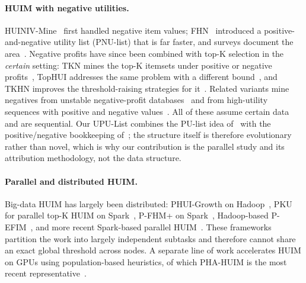 \documentclass[pdflatex,sn-vancouver-num]{sn-jnl}
\theoremstyle{thmstyleone}%
\theoremstyle{thmstyletwo}%
\theoremstyle{thmstylethree}%
\newcommand{\Kk}{\mathrm{K}}
\begin{document}
\paragraph{HUIM with negative utilities.}
HUINIV-Mine~\cite{chu2009huiniv} first handled negative item values;
FHN~\cite{lin2016fhn} introduced a positive-and-negative utility list
(PNU-list) that is far faster, and surveys document the
area~\cite{singh2018negsurvey}. Negative profits have since been
combined with top-$\Kk$ selection in the \emph{certain} setting: TKN
mines the top-$\Kk$ itemsets under positive or negative
profits~\cite{krishnamoorthy2022tkn}, TopHUI addresses the same problem
with a different bound~\cite{gan2020tophui}, and TKHN improves the
threshold-raising strategies for it~\cite{singh2026tkhn}. Related
variants mine negatives from unstable negative-profit
databases~\cite{tung2024unstable} and from high-utility sequences with
positive and negative values~\cite{zhang2023posneg}. All of these assume
certain data and are sequential. Our UPU-List combines the PU-list idea
of~\cite{lin2016phuim} with the positive/negative bookkeeping
of~\cite{lin2016fhn}; the structure itself is therefore evolutionary
rather than novel, which is why our contribution is the parallel study
and its attribution methodology, not the data structure.

\paragraph{Parallel and distributed HUIM.}
Big-data HUIM has largely been distributed: PHUI-Growth on
Hadoop~\cite{lin2015bigdata}, PKU for parallel top-$\Kk$ HUIM on
Spark~\cite{lin2019pku}, P-FHM+ on Spark~\cite{sethi2018pfhm},
Hadoop-based P-EFIM~\cite{cheng2023hadoop}, and more recent Spark-based
parallel HUIM~\cite{li2024spark}. These frameworks partition the work
into largely independent subtasks and therefore cannot share an exact
global threshold across nodes. A separate line of work accelerates HUIM
on GPUs using population-based heuristics, of which PHA-HUIM is the most
recent representative~\cite{fang2024gpu}.
 
\end{document}
